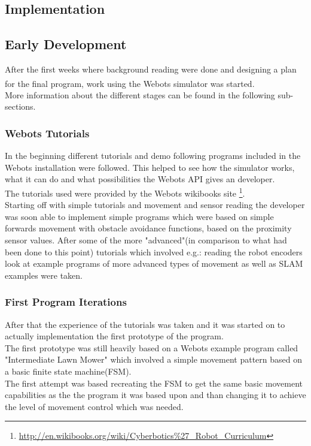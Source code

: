 \begin{flushleft}

\chapter{Implementation}
\label{Implementation}

\section{Early Development}
After the first weeks where background reading were done and designing a plan for the final program, work using the Webots\textsuperscript{\texttrademark} simulator was started. \\ More information about the different stages can be found in the following sub-sections. 

\subsection{Webots Tutorials}
In the beginning different tutorials and demo following  programs included in the Webots installation were followed. 
This helped to see how the simulator works, what it can do and what possibilities the Webots API gives an developer. \\
The tutorials used were provided by the Webots wikibooks site \footnote{\url{http://en.wikibooks.org/wiki/Cyberbotics\%27_Robot_Curriculum}}.\\
Starting off with simple tutorials and movement and sensor reading the developer was soon able to implement simple programs which were based on simple forwards movement with obstacle avoidance functions, based on the proximity sensor values. 
After some of the more "advanced"(in comparison to what had been done to this point) tutorials which involved e.g.: reading the robot encoders look at example programs of more advanced types of movement as well as SLAM examples were taken. \\

\subsection{First Program Iterations}
After that the experience of the tutorials was taken and it was started on to actually implementation the first prototype of the program. \\
The first prototype was still heavily based on a Webots example program called "Intermediate Lawn Mower" which involved a simple movement pattern based on a basic finite state machine(FSM). \\ 
The first attempt was based recreating the FSM to get the same basic movement capabilities as the the program it was based upon and than changing it to achieve the level of movement control which was needed. \\[3ex]


\end{flushleft}
